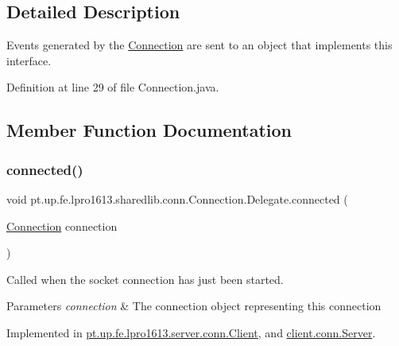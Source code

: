 \subsection{Detailed Description}
Events generated by the \hyperlink{classpt_1_1up_1_1fe_1_1lpro1613_1_1sharedlib_1_1conn_1_1_connection}{Connection} are sent to an object that implements this interface. 

Definition at line 29 of file Connection.\+java.



\subsection{Member Function Documentation}
\hypertarget{interfacept_1_1up_1_1fe_1_1lpro1613_1_1sharedlib_1_1conn_1_1_connection_1_1_delegate_afeb3c54ced46916733df2ba0b0e2d87e}{}\label{interfacept_1_1up_1_1fe_1_1lpro1613_1_1sharedlib_1_1conn_1_1_connection_1_1_delegate_afeb3c54ced46916733df2ba0b0e2d87e} 
\subsubsection{\texorpdfstring{connected()}{connected()}}
{\footnotesize\ttfamily void pt.\+up.\+fe.\+lpro1613.\+sharedlib.\+conn.\+Connection.\+Delegate.\+connected (\begin{DoxyParamCaption}\item[{\hyperlink{classpt_1_1up_1_1fe_1_1lpro1613_1_1sharedlib_1_1conn_1_1_connection}{Connection}}]{connection }\end{DoxyParamCaption})}

Called when the socket connection has just been started.


\begin{DoxyParams}{Parameters}
{\em connection} & The connection object representing this connection \\
\hline
\end{DoxyParams}


Implemented in \hyperlink{classpt_1_1up_1_1fe_1_1lpro1613_1_1server_1_1conn_1_1_client_a1cf160e68d7310d9f0b3a53d8b26f80d}{pt.\+up.\+fe.\+lpro1613.\+server.\+conn.\+Client}, and \hyperlink{classclient_1_1conn_1_1_server_ac8ad09c9052bfb32e082493ada8d14ab}{client.\+conn.\+Server}.

